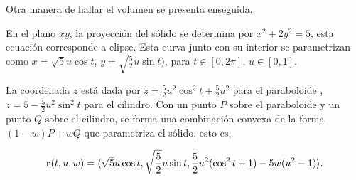 Otra manera de hallar el volumen se presenta enseguida.

En el plano $xy$, la proyección del sólido se determina por
$x^2+2y^2=5$, esta ecuación corresponde a elipse. Esta curva junto con su interior se parametrizan como {\small $x=\sqrt{5}u\cos t$,}
{\small $y=\sqrt{\frac{5}{2}}u\sin t)$,} para {\small $t\in [0,2\pi ]$,} {\small $u\in [0,1]$.}

La coordenada $z$ está dada por {\small $z = \frac{5}{2}u^2\cos ^2t+\frac{5}{2}u^2$} para el paraboloide , {\small $z=5-\frac{5}{2}u^2\sin ^2t$} para el cilindro.
Con un punto $P$ sobre el paraboloide y un punto $Q$ sobre el cilindro, se forma una combinación convexa de la forma $(1-w)P+wQ$ que parametriza el sólido, esto es,

\[{\bf r}(t,u,w)= \langle \sqrt{5}u\cos t,\sqrt{\frac{5}{2}}u\sin t,\frac{5}{2}u^2( \cos ^2t+1) -5w(u^2-1)\rangle.\]

